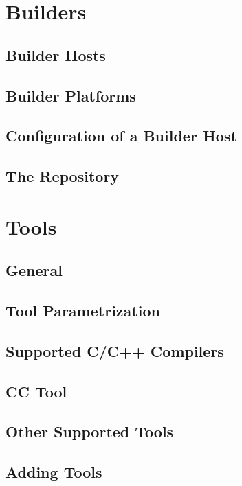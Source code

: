 \documentclass[a4paper]{book}
\begin{document}

\chapter{Builders}

\section{Builder Hosts}
\section{Builder Platforms}
\section{Configuration of a Builder Host}
\section{The Repository}


\chapter{Tools}

\section{General}
\section{Tool Parametrization}
\section{Supported C/C++ Compilers}
\section{CC Tool}
\section{Other Supported Tools}
\section{Adding Tools}
\end{document}
